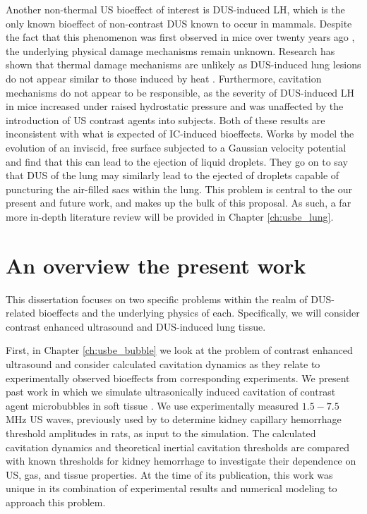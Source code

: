 Another non-thermal \ac{US} bioeffect of interest is \ac{DUS}-induced
\ac{LH}, which is the only known bioeffect of non-contrast \ac{DUS}
known to occur in mammals. Despite the fact that this phenomenon was
first observed in mice over twenty years ago \citep{Child1990}, the
underlying physical damage mechanisms remain unknown. Research has
shown that thermal damage mechanisms are unlikely as \ac{DUS}-induced
lung lesions do not appear similar to those induced by heat
\citep{Zachary2006}. Furthermore, cavitation mechanisms do not appear
to be responsible, as the severity of \ac{DUS}-induced \ac{LH} in mice
increased under raised hydrostatic pressure \citep{OBrien2000} and was
unaffected by the introduction of \ac{US} contrast agents into
subjects. Both of these results are inconsistent with what is expected
of \ac{IC}-induced bioeffects. Works by \cite{Tjan2007,Tjan2008} model
the evolution of an inviscid, free surface subjected to a Gaussian
velocity potential and find that this can lead to the ejection of
liquid droplets. They go on to say that \ac{DUS} of the lung may
similarly lead to the ejected of droplets capable of puncturing the
air-filled sacs within the lung. This problem is central to the our
present and future work, and makes up the bulk of this proposal. As
such, a far more in-depth literature review will be provided in
Chapter \ref{ch:usbe_lung}.

\section{An overview the present work}
\label{sec:usbe_intro_overview}%
This dissertation focuses on two specific problems within the realm of
\ac{DUS}-related bioeffects and the underlying physics of
each. Specifically, we will consider contrast enhanced ultrasound and
\ac{DUS}-induced lung tissue.

First, in Chapter \ref{ch:usbe_bubble} we look at the problem of
contrast enhanced ultrasound and consider calculated cavitation
dynamics as they relate to experimentally observed bioeffects from
corresponding experiments. We present past work in which we simulate
ultrasonically induced cavitation of contrast agent microbubbles in
soft tissue \citep{Patterson2012}. We use experimentally measured
$1.5-7.5$ MHz \ac{US} waves, previously used by \cite{Miller2008b} to
determine kidney capillary hemorrhage threshold amplitudes in rats, as
input to the simulation. The calculated cavitation dynamics and
theoretical inertial cavitation thresholds \citep{Flynn1982,Apfel1982}
are compared with known thresholds for kidney hemorrhage to
investigate their dependence on US, gas, and tissue properties. At the
time of its publication, this work was unique in its combination of
experimental results and numerical modeling to approach this problem.

